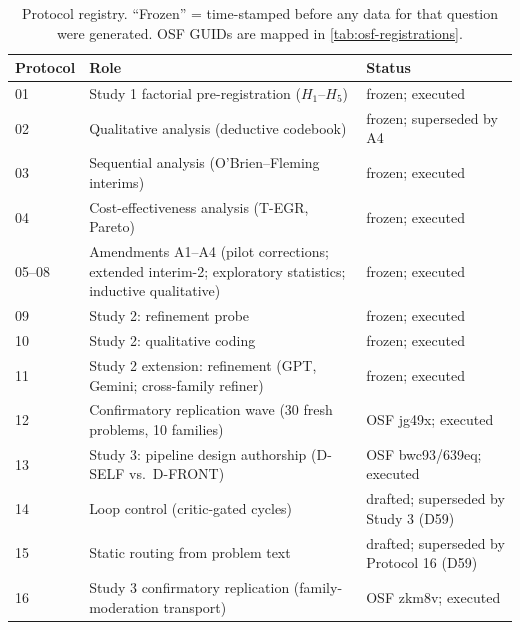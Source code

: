 \documentclass[12pt,a4paper]{article}
\begin{document}
\begin{table}[ht]
  \centering
  \caption{Protocol registry. ``Frozen'' = time-stamped before any data for
  that question were generated. OSF GUIDs are mapped in
  \cref{tab:osf-registrations}.}
  \label{tab:protocol-registry}
  \footnotesize
  \begin{tabular}{@{}l l l@{}}
    \toprule
    \textbf{Protocol} & \textbf{Role} & \textbf{Status} \\
    \midrule
    01 & Study 1 factorial pre-registration ($H_1$--$H_5$) & frozen; executed \\
    02 & Qualitative analysis (deductive codebook) & frozen; superseded by A4 \\
    03 & Sequential analysis (O'Brien--Fleming interims) & frozen; executed \\
    04 & Cost-effectiveness analysis (T-EGR, Pareto) & frozen; executed \\
    05--08 & Amendments A1--A4 (pilot corrections; extended interim-2;
             exploratory statistics; inductive qualitative) & frozen; executed \\
    09 & Study 2: refinement probe & frozen; executed \\
    10 & Study 2: qualitative coding & frozen; executed \\
    11 & Study 2 extension: refinement (GPT, Gemini; cross-family refiner) & frozen; executed \\
    12 & Confirmatory replication wave (30 fresh problems, 10 families) & OSF jg49x; executed \\
    13 & Study 3: pipeline design authorship (D-SELF vs.\ D-FRONT) & OSF bwc93/639eq; executed \\
    14 & Loop control (critic-gated cycles) & drafted; superseded by Study 3 (D59) \\
    15 & Static routing from problem text & drafted; superseded by Protocol 16 (D59) \\
    16 & Study 3 confirmatory replication (family-moderation transport) & OSF zkm8v; executed \\
    \bottomrule
  \end{tabular}
\end{table}
\end{document}

